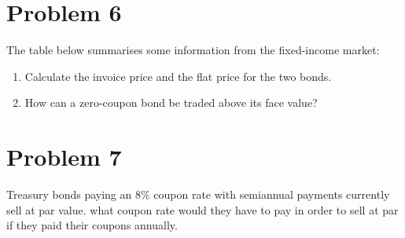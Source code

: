 \documentclass[12]{article}
\begin{document}
\section*{Problem 6}
The table below summarises some information from the fixed-income market:
\begin{table}[H]
\centering
{}
\label{tab:my-table}
\end{table}

\begin{enumerate}
    \item[a)] Calculate the invoice price and the flat price for the two bonds.
    \item[b)] How can a zero-coupon bond be traded above its face value?
\end{enumerate}




\color{black}
\section*{Problem 7}
Treasury bonds paying an 8\% coupon rate with semiannual payments currently sell at par value. what coupon rate would they have to pay in order to sell at par if they paid their coupons annually. 
\end{document}
